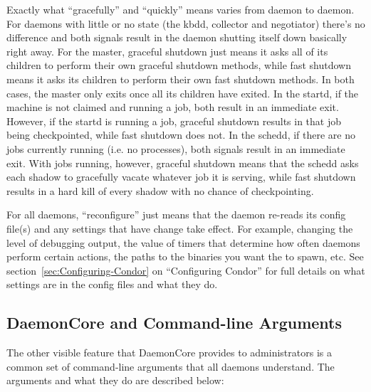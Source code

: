 Exactly what ``gracefully'' and ``quickly'' means varies from daemon
to daemon.  For daemons with little or no state (the kbdd, collector and
negotiator) there's no difference and both signals result in the
daemon shutting itself down basically right away.  For the master,
graceful shutdown just means it asks all of its children to perform
their own graceful shutdown methods, while fast shutdown means it asks
its children to perform their own fast shutdown methods.  In both
cases, the master only exits once all its children have exited.  In
the startd, if the machine is not claimed and running a job, both
result in an immediate exit.  However, if the startd is running a job,
graceful shutdown results in that job being checkpointed, while fast
shutdown does not.  In the schedd, if there are no jobs currently
running (i.e. no  processes), both signals result in an
immediate exit.  With jobs running, however, graceful shutdown means
that the schedd asks each shadow to gracefully vacate whatever job it
is serving, while fast shutdown results in a hard kill of every shadow
with no chance of checkpointing.  

For all daemons, ``reconfigure'' just means that the daemon re-reads
its config file(s) and any settings that have change take effect.  For
example, changing the level of debugging output, the value of timers
that determine how often daemons perform certain actions, the paths to
the binaries you want the  to spawn, etc.  See
section~\ref{sec:Configuring-Condor} on ``Configuring Condor'' for
full details on what settings are in the config files and what they
do.

\subsection{DaemonCore and Command-line Arguments}
\label{sec:DaemonCore-Arguments}

The other visible feature that DaemonCore provides to administrators
is a common set of command-line arguments that all daemons understand.
The arguments and what they do are described below:

